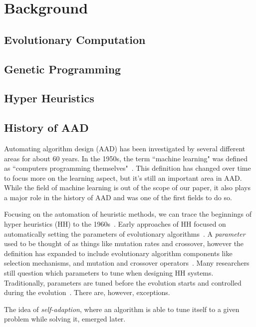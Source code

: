 \documentclass{sig-alternate}
\begin{document}
\section{Background}
\label{sec:background}

\subsection{Evolutionary Computation}
\label{sec:evocomp}

\subsection{Genetic Programming}
\label{sec:GP}

\subsection{Hyper Heuristics}
\label{sec:HH}


\subsection{History of AAD}
\label{sec:history}
Automating algorithm design (AAD) has been investigated by several different areas for about 60 years. In the 1950s, the term ``machine learning" was defined as ``computers programming themselves"~\cite{pappa:2014}. This definition has changed over time to focus more on the learning aspect, but it's still an important area in AAD. While the field of machine learning is out of the scope of our paper, it also plays a major role in the history of AAD and was one of the first fields to do so.

Focusing on the automation of heuristic methods, we can trace the beginnings of hyper heuristics (HH) to the 1960s~\cite{pappa:2014}. Early approaches of HH focused on automatically setting the parameters of evolutionary algorithms~\cite{pappa:2014}. A \textit{parameter} used to be thought of as things like mutation rates and crossover, however the definition has expanded to include evolutionary algorithm components like selection mechanisms, and mutation and crossover operators~\cite{pappa:2014}. Many researchers still question which parameters to tune when designing HH systems. Traditionally, parameters are tuned before the evolution starts and controlled during the evolution~\cite{pappa:2014}. There are, however, exceptions.

The idea of \textit{self-adaption}, where an algorithm is able to tune itself to a given problem while solving it, emerged later.
\end{document}
